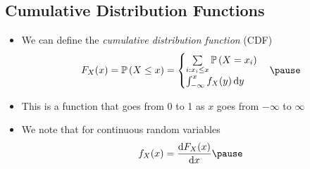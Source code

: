 
\begin{slide}
\section{Cumulative Distribution Functions}
  
\begin{PauseHighLight}
  \begin{itemize}
  \item We can define the \emph{cumulative distribution function} (CDF)
    \begin{align*}
      F_X(x) = \Prob{X\leq x} =
      \begin{cases}
        \sum\limits_{i: x_i\leq x} \Prob{X=x_i} \\
        \int_{-\infty}^x f_X(y) \, \dd y
      \end{cases}\pause
    \end{align*}
  \item This is a function that goes from 0 to 1 as $x$ goes from
    $-\infty$ to $\infty$\pause
  \item We note that for continuous random variables
    \begin{align*}
      f_X(x) = \frac{\dd F_X(x)}{\dd x}\pause
    \end{align*}
  \end{itemize}
\end{PauseHighLight}

\end{slide}


